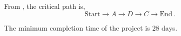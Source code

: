 \begin{subquestions}
\subquestion

\begin{subsubquestions}
	

\subsubquestion

From , the critical path is,
\begin{equation}
	\text{Start} \rightarrow A \rightarrow D \rightarrow C \rightarrow \text{End}\,.
\end{equation}


\subsubquestion

The minimum completion time of the project is $28$ days.
\end{subsubquestions}

\end{subquestions}

